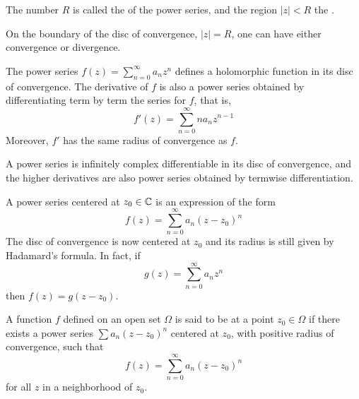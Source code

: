 \documentclass{mathnotes}
\begin{document}
\begin{defi}
  The number $R$ is called the  of the power
  series, and the region $|z|<R$ the .
\end{defi}

\begin{note}
  On the boundary of the disc of convergence, $|z|=R$, one can have either
  convergence or divergence.
\end{note}

\begin{thm}
  The power series $f(z)=\sum_{n=0}^\infty a_nz^n$ defines a holomorphic
  function in its disc of convergence. The derivative of $f$ is also a power
  series obtained by differentiating term by term the series for $f$, that is,
  $$f'(z)=\sum_{n=0}^\infty na_nz^{n-1}$$
  Moreover, $f'$ has the same radius of convergence as $f$.
\end{thm}

\begin{cor}
  A power series is infinitely complex differentiable in its disc of
  convergence, and the higher derivatives are also power series obtained by
  termwise differentiation.
\end{cor}

\begin{note}
  A power series centered at $z_0\in\mathbb{C}$ is an expression of the form
  $$f(z)=\sum_{n=0}^\infty a_n(z-z_0)^n$$
  The disc of convergence is now centered at $z_0$ and its radius is still
  given by Hadamard's formula. In fact, if
  $$g(z)=\sum_{n=0}^\infty a_nz^n$$
  then $f(z)=g(z-z_0)$.
\end{note}

\begin{defi}
  A function $f$ defined on an open set $\Omega$ is said to be
   at a point $z_0\in\Omega$ if there exists a power series
  $\sum a_n(z-z_0)^n$ centered at $z_0$, with positive radius of convergence,
  such that
  $$f(z)=\sum_{n=0}^\infty a_n(z-z_0)^n$$
  for all $z$ in a neighborhood of $z_0$.
\end{defi}
\end{document}
